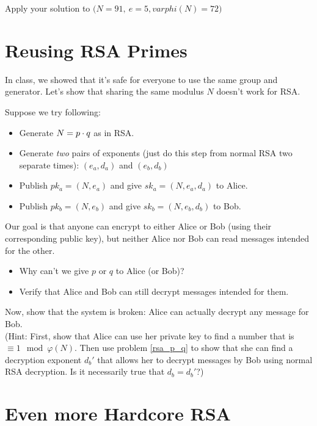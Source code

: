 \documentclass[12pt]{article}
\begin{document}
Apply your solution to $\Big(N = 91,~e = 5, varphi(N) = 72\Big)$

\section{Reusing RSA Primes}

\label{rsa_reuse}

In class, we showed that it's safe for everyone to use the same group and generator. Let's show that sharing the same modulus $N$ doesn't work for RSA.

Suppose we try following:

\begin{itemize}
\item Generate $N = p \cdot q$ as in RSA.
\item Generate \emph{two} pairs of exponents (just do this step from normal RSA two separate times): $(e_a, d_a)$ and $(e_b, d_b)$
\item Publish $pk_a = (N, e_a)$ and give $sk_a = (N, e_a, d_a)$ to Alice.
\item Publish $pk_b = (N, e_b)$ and give $sk_b = (N, e_b, d_b)$ to Bob.
\end{itemize}

Our goal is that anyone can encrypt to either Alice or Bob (using their corresponding public key), but neither Alice nor Bob can read messages intended for the other.

\begin{itemize}
\item Why can't we give $p$ or $q$ to Alice (or Bob)?
\item Verify that Alice and Bob can still decrypt messages intended for them.
\end{itemize}

Now, show that the system is broken: Alice can actually decrypt any message for Bob.\\

(Hint: First, show that Alice can use her private key to find a number that is $\equiv 1 \mod \varphi(N)$. Then use problem \ref{rsa_p_q} to show that she can find a decryption exponent $d_b'$ that allows her to decrypt messages by Bob using normal RSA decryption. Is it necessarily true that $d_b = d_b'$?)



\section{Even more Hardcore RSA}
\end{document}
